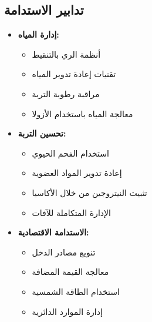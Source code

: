 \subsection{تدابير الاستدامة}
\begin{itemize}
    \item \textbf{إدارة المياه:}
    \begin{itemize}
        \item أنظمة الري بالتنقيط
        \item تقنيات إعادة تدوير المياه
        \item مراقبة رطوبة التربة
        \item معالجة المياه باستخدام الأزولا
    \end{itemize}
    
    \item \textbf{تحسين التربة:}
    \begin{itemize}
        \item استخدام الفحم الحيوي
        \item إعادة تدوير المواد العضوية
        \item تثبيت النيتروجين من خلال الأكاسيا
        \item الإدارة المتكاملة للآفات
    \end{itemize}
    
    \item \textbf{الاستدامة الاقتصادية:}
    \begin{itemize}
        \item تنويع مصادر الدخل
        \item معالجة القيمة المضافة
        \item استخدام الطاقة الشمسية
        \item إدارة الموارد الدائرية
    \end{itemize}
\end{itemize}
